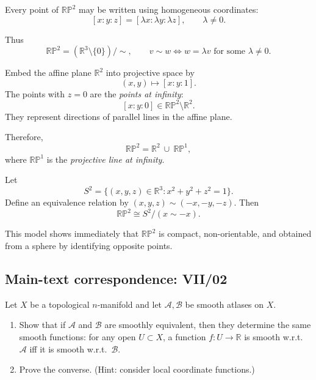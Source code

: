 \begin{solution}
\begin{definition}
	Every point of $\mathbb{RP}^2$ may be written using homogeneous coordinates:
	\[
	[x:y:z] = [\lambda x : \lambda y : \lambda z], \qquad \lambda \neq 0.
	\]
	
	Thus
	\[
	\mathbb{RP}^2 = (\mathbb{R}^3 \setminus \{0\}) / \!\sim ,
	\qquad v \sim w \Longleftrightarrow w = \lambda v \text{ for some } \lambda \ne 0.
	\]
\end{definition}

\begin{definition}
	Embed the affine plane $\mathbb{R}^2$ into projective space by
	\[
	(x,y) \longmapsto [x : y : 1].
	\]
	The points with $z=0$ are the \emph{points at infinity}:
	\[
	[x : y : 0] \in \mathbb{RP}^2 \setminus \mathbb{R}^2.
	\]
	They represent directions of parallel lines in the affine plane.
	
	Therefore,
	\[
	\mathbb{RP}^2 = \mathbb{R}^2 \ \cup\  \mathbb{RP}^1,
	\]
	where $\mathbb{RP}^1$ is the \emph{projective line at infinity}.
\end{definition}

\begin{definition}
	Let
	\[
	S^2 = \{ (x,y,z)\in\mathbb{R}^3 : x^2 + y^2 + z^2 = 1 \}.
	\]
	Define an equivalence relation by $(x,y,z) \sim (-x,-y,-z)$.
	Then
	\[
	\mathbb{RP}^2 \cong S^2 / (x \sim -x).
	\]
	
	This model shows immediately that $\mathbb{RP}^2$ is compact, non-orientable,
	and obtained from a sphere by identifying opposite points.
\end{definition}
\end{solution}

\subsection*{Main-text correspondence: VII/02}

\begin{problem}
\label{prob:cp-vii-0005}
Let $X$ be a topological $n$-manifold and let $\mathcal A,\mathcal B$ be smooth atlases on $X$.
\begin{enumerate}
	\item[(a)] Show that if $\mathcal A$ and $\mathcal B$ are smoothly equivalent, then they determine the same smooth functions:
	for any open $U\subset X$, a function $f:U\to\mathbb R$ is smooth w.r.t.\ $\mathcal A$ iff it is smooth w.r.t.\ $\mathcal B$.
	\item[(b)] Prove the converse. (Hint: consider local coordinate functions.)
\end{enumerate}

\medskip
\end{problem}

